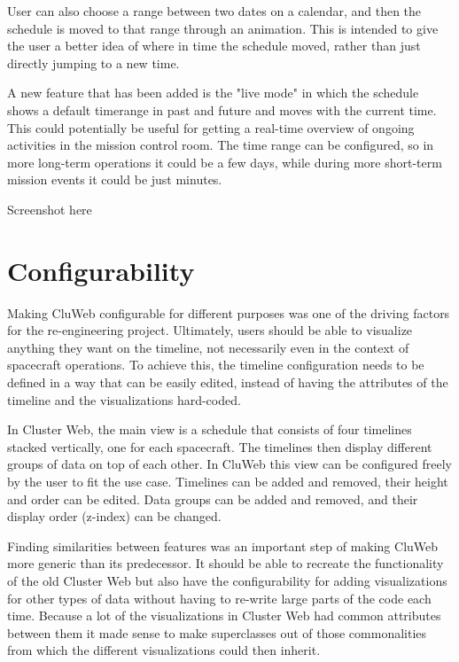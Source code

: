 User can also choose a range between two dates on a calendar, and then the schedule is moved to that range through an animation. This is intended to give the user a better idea of where in time the schedule moved, rather than just directly jumping to a new time.

 A new feature that has been added is the "live mode" in which the schedule shows a default timerange in past and future and moves with the current time. This could potentially be useful for getting a real-time overview of ongoing activities in the mission control room. The time range can be configured, so in more long-term operations it could be a few days, while during more short-term mission events it could be just minutes.
 
Screenshot here

\section{Configurability}
Making CluWeb configurable for different purposes was one of the driving factors for the re-engineering project. Ultimately, users should be able to visualize anything they want on the timeline, not necessarily even in the context of spacecraft operations. To achieve this, the timeline configuration needs to be defined in a way that can be easily edited, instead of having the attributes of the timeline and the visualizations hard-coded.

In Cluster Web, the main view is a schedule that consists of four timelines stacked vertically, one for each spacecraft. The timelines then display different groups of data on top of each other. In CluWeb this view can be configured freely by the user to fit the use case. Timelines can be added and removed, their height and order can be edited. Data groups can be added and removed, and their display order (z-index) can be changed.

Finding similarities between features was an important step of making CluWeb more generic than its predecessor. It should be able to recreate the functionality of the old Cluster Web but also have the configurability for adding visualizations for other types of data without having to re-write large parts of the code each time. Because a lot of the visualizations in Cluster Web had common attributes between them it made sense to make superclasses out of those commonalities from which the different visualizations could then inherit.

